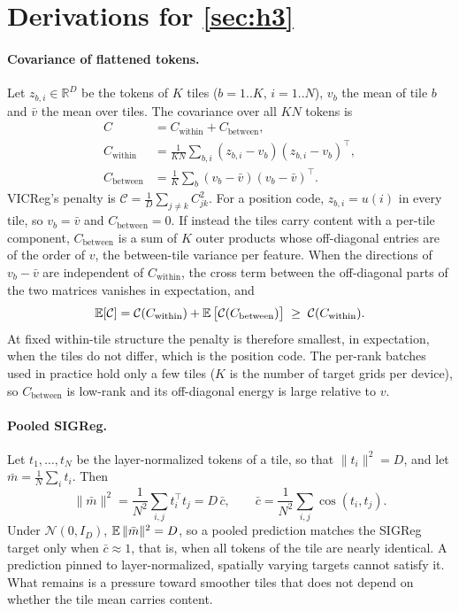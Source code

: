 \section{Derivations for \cref{sec:h3}}
\label{sec:supp_derivations}

\paragraph{Covariance of flattened tokens.} Let $z_{b,i} \in \mathbb{R}^D$ be the tokens of $K$ tiles ($b = 1..K$, $i = 1..N$), $v_b$ the mean of tile $b$ and $\bar v$ the mean over tiles. The covariance over all $KN$ tokens is
\begin{align}
  C &= C_{\text{within}} + C_{\text{between}}, \\
  C_{\text{within}} &= \frac{1}{KN}\sum_{b,i}(z_{b,i}-v_b)(z_{b,i}-v_b)^\top, \\
  C_{\text{between}} &= \frac{1}{K}\sum_b (v_b-\bar v)(v_b-\bar v)^\top.
\end{align}
VICReg's penalty is $\mathcal{C} = \frac{1}{D}\sum_{j\neq k} C_{jk}^2$. For a position code, $z_{b,i} = u(i)$ in every tile, so $v_b = \bar v$ and $C_{\text{between}} = 0$. If instead the tiles carry content with a per-tile component, $C_{\text{between}}$ is a sum of $K$ outer products whose off-diagonal entries are of the order of $v$, the between-tile variance per feature. When the directions of $v_b - \bar v$ are independent of $C_{\text{within}}$, the cross term between the off-diagonal parts of the two matrices vanishes in expectation, and
\begin{equation}
  \operatorname*{\mathbb{E}}[\mathcal{C}] = \mathcal{C}(C_{\text{within}}) + \operatorname*{\mathbb{E}}\big[\mathcal{C}(C_{\text{between}})\big] \;\geq\; \mathcal{C}(C_{\text{within}}).
\end{equation}
At fixed within-tile structure the penalty is therefore smallest, in expectation, when the tiles do not differ, which is the position code. The per-rank batches used in practice hold only a few tiles ($K$ is the number of target grids per device), so $C_{\text{between}}$ is low-rank and its off-diagonal energy is large relative to $v$.

\paragraph{Pooled SIGReg.} Let $t_1, \dots, t_N$ be the layer-normalized tokens of a tile, so that $\|t_i\|^2 = D$, and let $\bar m = \frac{1}{N}\sum_i t_i$. Then
\begin{equation}
  \|\bar m\|^2 = \frac{1}{N^2}\sum_{i,j} t_i^\top t_j = D\,\bar c, \qquad \bar c = \frac{1}{N^2}\sum_{i,j}\cos(t_i, t_j).
\end{equation}
Under $\mathcal{N}(0, I_D)$, $\operatorname*{\mathbb{E}}\|\bar m\|^2 = D$, so a pooled prediction matches the SIGReg target only when $\bar c \approx 1$, that is, when all tokens of the tile are nearly identical. A prediction pinned to layer-normalized, spatially varying targets cannot satisfy it. What remains is a pressure toward smoother tiles that does not depend on whether the tile mean carries content.

